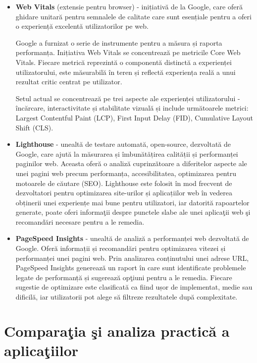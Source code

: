 \documentclass[12pt, a4paper]{report}
\begin{document}
\begin{itemize}
	\item  \textbf{Web Vitals} (extensie pentru browser) - inițiativă de la Google, care oferă ghidare unitară pentru semnalele de calitate care sunt esențiale pentru a oferi o experiență excelentă utilizatorilor pe web.

	      Google a furnizat o serie de instrumente pentru a măsura și raporta performanța. Inițiativa Web Vitals se concentreaz\u a pe metricile Core Web Vitals. Fiecare metric\u a reprezintă o componentă distinctă a experienței utilizatorului, este măsurabilă în teren și reflectă experiența reală a unui rezultat critic centrat pe utilizator.

	      Setul actual se concentrează pe trei aspecte ale experienței utilizatorului - încărcare, interactivitate și stabilitate vizuală și include următoarele metrici: Largest Contentful Paint (LCP), First Input Delay (FID), Cumulative Layout Shift (CLS).

	\item \textbf{Lighthouse} - unealtă de testare automată, open-source, dezvoltată de Google, care ajută la măsurarea și îmbunătățirea calității și performanței paginilor web. Aceasta oferă o analiză cuprinzătoare a diferitelor aspecte ale unei pagini web precum performanța, accesibilitatea, optimizarea pentru motoarele de căutare (SEO). Lighthouse este folosit în mod frecvent de dezvoltatori pentru optimizarea site-urilor și aplicațiilor web în vederea obținerii unei experiențe mai bune pentru utilizatori, iar datorită rapoartelor generate, poate oferi informa\c tii despre punctele slabe ale unei aplica\c tii web \c si recomand\u ari necesare pentru a le remedia.

	\item \textbf{PageSpeed Insights} - unealtă de analiză a performanței web dezvoltată de Google. Oferă informații și recomandări pentru optimizarea vitezei și performanței unei pagini web. Prin analizarea conținutului unei adrese URL, PageSpeed Insights generează un raport \^in care sunt identificate problemele legate de performanță și sugerează op\c tiuni pentru a le remedia. Fiecare sugestie de optimizare este clasificată ca fiind ușor de implementat, medie sau dificilă, iar utilizatorii pot alege să filtreze rezultatele după complexitate.
\end{itemize}

\section{Compara\c tia \c si analiza practică a aplica\c tiilor}
\end{document}
